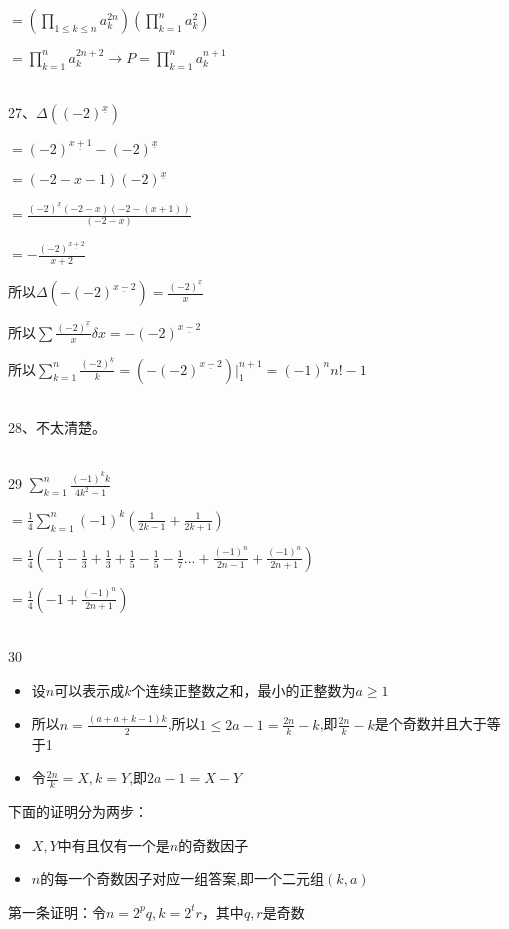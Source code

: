 \documentclass[onecolumn]{article}
\begin{document}
$=\left (\prod_{1\leq k\leq n}a_{k}^{2n}  \right )\left ( \prod _{k=1}^{n}a_{k}^{2} \right )$\par
$= \prod _{k=1}^{n}a_{k}^{2n+2} \rightarrow P=\prod _{k=1}^{n}a_{k}^{n+1}$\par
~\\
27、$\Delta ((-2)^{\underline{x}})$ \par
$=(-2)^{\underline{x+1}}-(-2)^{\underline{x}}$ \par
$=(-2-x-1)(-2)^{\underline{x}}$ \par
$=\frac{(-2)^{\underline{x}}(-2-x)(-2-(x+1))}{(-2-x)}$ \par
$=-\frac{(-2)^{\underline{x+2}}}{x+2}$ \par
所以$\Delta (-(-2)^{\underline{x-2}})=\frac{(-2)^{\underline{x}}}{x}$ \par
所以$\sum \frac{(-2)^{\underline{x}}}{x}\delta x=-(-2)^{\underline{x-2}}$ \par
所以$\sum_{k=1}^{n} \frac{(-2)^{\underline{k}}}{k}=\left (-(-2)^{\underline{x-2}}  \right  )|_{1}^{n+1}=(-1)^{n}n!-1$ \par
~\\
28、不太清楚。\par
~\\
29 $\sum_{k=1}^{n}\frac{(-1)^{k}k}{4k^{2}-1}$ \par
$=\frac{1}{4}\sum_{k=1}^{n}(-1)^{k}(\frac{1}{2k-1}+\frac{1}{2k+1})$ \par
$=\frac{1}{4}(-\frac{1}{1}-\frac{1}{3}+\frac{1}{3}+\frac{1}{5}-\frac{1}{5}-\frac{1}{7}...+\frac{(-1)^{n}}{2n-1}+\frac{(-1)^{n}}{2n+1})$ \par
$=\frac{1}{4}(-1+\frac{(-1)^{n}}{2n+1})$ \par 
~\\
30 
\begin{itemize}
	\item 设$n$可以表示成$k$个连续正整数之和，最小的正整数为$a \ge  1$
	\item 所以$n=\frac{(a+a+k-1)k}{2}$,所以$1 \le 2a-1=\frac{2n}{k}-k$,即$\frac{2n}{k}-k$是个奇数并且大于等于1
	\item 令$\frac{2n}{k}=X,k=Y$,即$2a-1=X-Y$
\end{itemize}
下面的证明分为两步：
\begin{itemize}
	\item $X,Y$中有且仅有一个是$n$的奇数因子
	\item $n$的每一个奇数因子对应一组答案,即一个二元组$(k,a)$
\end{itemize}
第一条证明：令$n=2^{p}q,k=2^{t}r$，其中$q,r$是奇数\par
\end{document}
